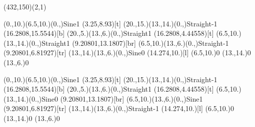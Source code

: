 \unitlength=1bp%

\begin{feynartspicture}(432,150)(2,1)

\FADiagram{}
\FAProp(0.,10.)(6.5,10.)(0.,){Sine}{1}
\FALabel(3.25,8.93)[t]{}
\FAProp(20.,15.)(13.,14.)(0.,){Straight}{-1}
\FALabel(16.2808,15.5544)[b]{}
\FAProp(20.,5.)(13.,6.)(0.,){Straight}{1}
\FALabel(16.2808,4.44558)[t]{}
\FAProp(6.5,10.)(13.,14.)(0.,){Straight}{1}
\FALabel(9.20801,13.1807)[br]{}
\FAProp(6.5,10.)(13.,6.)(0.,){Straight}{-1}
\FALabel(9.20801,6.81927)[tr]{}
\FAProp(13.,14.)(13.,6.)(0.,){Sine}{0}
\FALabel(14.274,10.)[l]{}
\FAVert(6.5,10.){0}
\FAVert(13.,14.){0}
\FAVert(13.,6.){0}

\FADiagram{}
\FAProp(0.,10.)(6.5,10.)(0.,){Sine}{1}
\FALabel(3.25,8.93)[t]{}
\FAProp(20.,15.)(13.,14.)(0.,){Straight}{-1}
\FALabel(16.2808,15.5544)[b]{}
\FAProp(20.,5.)(13.,6.)(0.,){Straight}{1}
\FALabel(16.2808,4.44558)[t]{}
\FAProp(6.5,10.)(13.,14.)(0.,){Sine}{0}
\FALabel(9.20801,13.1807)[br]{}
\FAProp(6.5,10.)(13.,6.)(0.,){Sine}{1}
\FALabel(9.20801,6.81927)[tr]{}
\FAProp(13.,14.)(13.,6.)(0.,){Straight}{-1}
\FALabel(14.274,10.)[l]{}
\FAVert(6.5,10.){0}
\FAVert(13.,14.){0}
\FAVert(13.,6.){0}
\end{feynartspicture}

